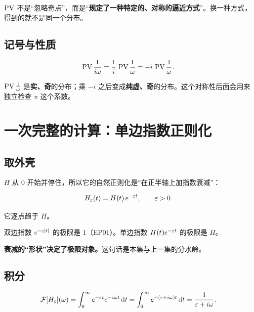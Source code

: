 \begin{warnbox}[结论]
$\operatorname{PV}$ 不是“忽略奇点”，而是“\textbf{规定了一种特定的、对称的逼近方式}”。换一种方式，得到的就不是同一个分布。
\end{warnbox}

\subsection{记号与性质}

\begin{equation}
\operatorname{PV}\frac{1}{i\omega}=\frac{1}{i}\,\operatorname{PV}\frac{1}{\omega}=-i\,\operatorname{PV}\frac{1}{\omega}.
\end{equation}

$\operatorname{PV}\frac{1}{\omega}$ 是\textbf{实、奇}的分布；乘 $-i$ 之后变成\textbf{纯虚、奇}的分布。这个对称性后面会用来独立检查 $\pi$ 这个系数。

\section{一次完整的计算：单边指数正则化}

\subsection{取外壳}

$H$ 从 $0$ 开始并停住，所以它的自然正则化是“在正半轴上加指数衰减”：

\begin{equation}
H_\varepsilon(t)=H(t)\,e^{-\varepsilon t},\qquad \varepsilon>0 .
\end{equation}

它逐点趋于 $H$。

\begin{notebox}[为什么不用双边指数]
双边指数 $e^{-\varepsilon|t|}$ 的极限是 $1$（EP01）。单边指数 $H(t)e^{-\varepsilon t}$ 的极限是 $H$。

\textbf{衰减的“形状”决定了极限对象。}这句话是本集与上一集的分水岭。
\end{notebox}

\subsection{积分}

\begin{equation}
\mathcal{F}[H_\varepsilon](\omega)=\int_{0}^{\infty}e^{-\varepsilon t}e^{-i\omega t}\mathop{}\!\mathrm{d} t
=\int_{0}^{\infty}e^{-(\varepsilon+i\omega)t}\mathop{}\!\mathrm{d} t
=\frac{1}{\varepsilon+i\omega}.\label{eq:Heps}
\end{equation}

